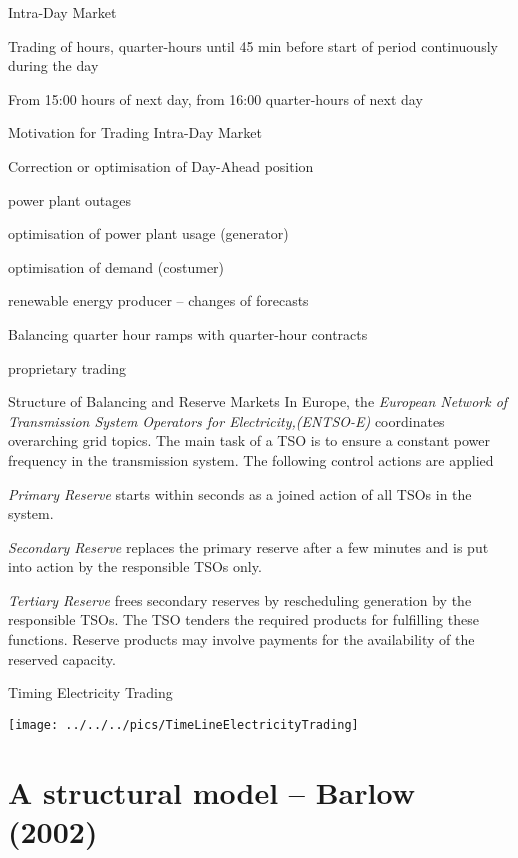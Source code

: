 {Intra-Day Market }
\item<1-> Trading of hours, quarter-hours until 45 min before start of period continuously during the day
\item<2-> From 15:00 hours of next day, from 16:00 quarter-hours of next day

{Motivation for Trading Intra-Day Market }
\item<1-> Correction or optimisation of Day-Ahead position
\item power plant outages
\item optimisation of power plant usage (generator)
\item optimisation of demand (costumer)
\item renewable energy producer -- changes of forecasts
\item<2-> Balancing quarter hour ramps with quarter-hour contracts
\item<3-> proprietary trading

{Structure of Balancing and Reserve Markets }
In Europe, the {\it European Network of Transmission System Operators for Electricity,(ENTSO-E)} coordinates overarching grid topics. The main task of a TSO is to ensure a constant power frequency in the transmission system. The following control actions are applied
\item<1->{\it Primary Reserve}   starts within seconds as a joined action of all TSOs in the system.
\item<2-> {\it Secondary Reserve} replaces the primary reserve after a few minutes and is put into action by the responsible TSOs only.
\item<3->{\it Tertiary Reserve} frees secondary reserves by rescheduling generation by the responsible TSOs.
The TSO tenders the required products for fulfilling these functions. Reserve products may involve payments for the availability of the reserved capacity.

{Timing Electricity Trading}
\begin{center}
\texttt{[image: ../../../pics/TimeLineElectricityTrading]}
\end{center}

\section{A structural model -- Barlow (2002)}

